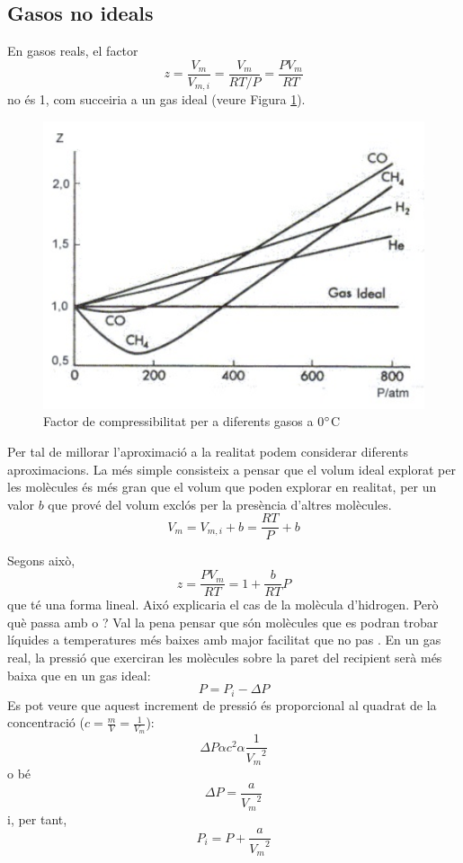 \subsection{Gasos no ideals}

En gasos reals, el factor 
\[z=\frac{V_m}{V_{m,i}}=\frac{V_m}{RT/P}=\frac{PV_m}{RT}\]
no és 1, com succeiria a un gas ideal (veure Figura \ref{fig:FactorCompress}).
\begin{figure}[h]
\centering
\includegraphics[scale=0.5]{figures/FactorCompress.png}
\caption{Factor de compressibilitat per a diferents gasos a 0$\degree$C}
\label{fig:FactorCompress}
\end{figure}

Per tal de millorar l'aproximació a la realitat podem considerar diferents aproximacions. La més simple consisteix a pensar que el volum ideal explorat per les molècules és més gran que el volum que poden explorar en realitat, per un valor $b$ que prové del volum exclós per la presència d'altres molècules.
\[V_m = V_{m,i}+b=\frac{RT}{P}+b\]

Segons això,
\[z=\frac{PV_m}{RT}=1+\frac{b}{RT}P\]
que té una forma lineal. Aixó explicaria el cas de la molècula d'hidrogen.
Però què passa amb  o ? Val la pena pensar que són molècules que es podran trobar líquides a temperatures més baixes amb major facilitat que no pas . En un gas real, la pressió que exerciran les molècules sobre la paret del recipient serà més baixa que en un gas ideal:
\[P=P_i -\Delta P\]
Es pot veure que aquest increment de pressió és proporcional al quadrat de la concentració ($c=\frac{m}{V}=\frac{1}{V_m}$):
\[\Delta P \alpha c^2 \alpha \frac{1}{{V_m}^2} \]
o bé
\[\Delta P = \frac{a}{{V_m}^2}\]
i, per tant, 
\[ P_i=P+\frac{a}{{V_m}^2}\]

